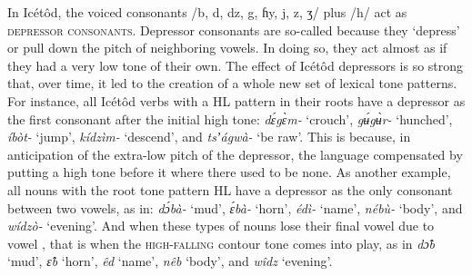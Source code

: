 In Icétôd, the voiced consonants /b, d, dz, g, ɦy, j, z, ʒ/ plus /h/ act as \textsc{depressor consonants}. Depressor consonants are so-called because they ‘depress’ or pull down the pitch of neighboring vowels. In doing so, they act almost as if they had a very low tone of their own. The effect of Icétôd depressors is so strong that, over time, it led to the creation of a whole new set of lexical tone patterns. For instance, all Icétôd verbs with a HL pattern in their roots have a depressor as the first consonant after the initial high tone: \textit{d\'{ɛ}g\`{ɛ}m-} ‘crouch’, \textit{g\'{ʉ}g\`{ʉ}r-} ‘hunched’, \textit{íbòt-} ‘jump’, \textit{kídzìm-} ‘descend’, and \textit{tsʼágwà-} ‘be raw’. This is because, in anticipation of the extra-low pitch of the depressor, the language compensated by putting a high tone before it where there used to be none. As another example, all nouns with the root tone pattern HL have a depressor as the only consonant between two vowels, as in: \textit{d\'{ɔ}bà-} ‘mud’, \textit{\'{ɛ}bà-} ‘horn’, \textit{édì-} ‘name’, \textit{nébù-} ‘body’, and \textit{wídzò-} ‘evening’. And when these types of nouns lose their final vowel due to vowel , that is when the \textsc{high-falling} contour tone comes into play, as in \textit{d\^{ɔ}b\ᵃ} ‘mud’, \textit{\^{ɛ}b\ᵃ} ‘horn’, \textit{êd\ᵃ} ‘name’, \textit{nêb\ᵃ} `body', and \textit{wîdz\ᵃ} ‘evening’.